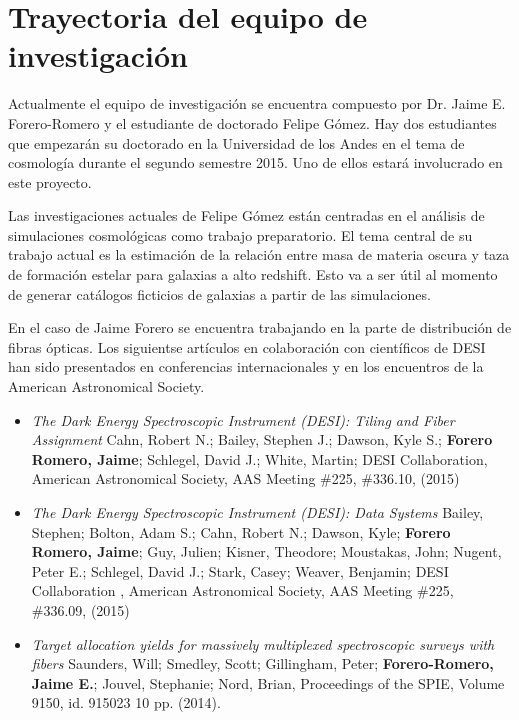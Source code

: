 
\section{Trayectoria del equipo de investigaci\'on}

Actualmente el equipo de investigaci\'on se encuentra compuesto por
Dr. Jaime E. Forero-Romero y el estudiante de doctorado Felipe
G\'omez. Hay dos estudiantes que empezar\'an su doctorado en la
Universidad de los Andes en el tema de cosmolog\'ia durante el segundo semestre 2015. Uno de ellos estar\'a involucrado en este proyecto.  

Las investigaciones actuales de Felipe G\'omez est\'an centradas en el
an\'alisis de simulaciones cosmol\'ogicas como trabajo
preparatorio. El tema central de su trabajo actual es la estimaci\'on
de la relaci\'on entre masa de materia oscura y taza de formaci\'on
estelar para galaxias a alto redshift. Esto va a ser \'util al momento
de generar cat\'alogos ficticios de galaxias a partir de las
simulaciones.  

En el caso de Jaime Forero se encuentra trabajando en la parte de
distribuci\'on de fibras \'opticas. Los siguientse art\'iculos en
colaboraci\'on con cient\'ificos de DESI han sido presentados en
conferencias internacionales y en los encuentros de la  American
Astronomical Society.


\begin{itemize}
\item {\it The Dark Energy Spectroscopic Instrument (DESI): Tiling and
  Fiber Assignment} Cahn, Robert N.; Bailey, Stephen J.; Dawson, Kyle
  S.; {\bf Forero Romero, Jaime}; Schlegel, David J.; White, Martin;
  DESI Collaboration, American Astronomical Society, AAS Meeting \#225,
  \#336.10, (2015)
\item {\it The Dark Energy Spectroscopic Instrument (DESI): Data
  Systems} 	
	Bailey, Stephen; Bolton, Adam S.; Cahn, Robert N.; Dawson,
        Kyle; {\bf Forero Romero, Jaime}; Guy, Julien; Kisner, Theodore;
        Moustakas, John; Nugent, Peter E.; Schlegel, David J.; Stark,
        Casey; Weaver, Benjamin; DESI Collaboration , American
        Astronomical Society, AAS Meeting \#225, \#336.09, (2015)
\item {\it Target allocation yields for massively multiplexed
  spectroscopic surveys with fibers} 	
	Saunders, Will; Smedley, Scott; Gillingham, Peter;
        {\bf Forero-Romero, Jaime E.}; Jouvel, Stephanie; Nord, Brian,
        Proceedings of the SPIE, Volume 9150, id. 915023 10
        pp. (2014). 
\end{itemize}



